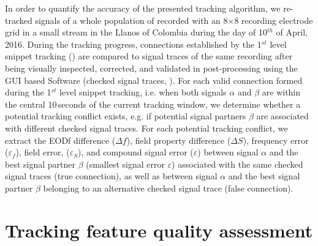 In order to quantify the accuracy of the presented tracking algorithm, we re-tracked signals of a whole population of \lepto{} recorded with an 8$\times$8 recording electrode grid in a small stream in the Llanos of Colombia during the day of 10$^{th}$ of April, 2016. During the tracking progress, connections established by the 1$^{st}$ level snippet tracking () are compared to signal traces of the same recording after being visually inspected, corrected, and validated in post-processing using the GUI based Software (checked signal traces, ). For each valid connection formed during the 1$^{st}$ level snippet tracking, i.e. when both signals $\alpha$ and $\beta$ are within the central 10\,seconds of the current tracking window, we determine whether a potential tracking conflict exists, e.g. if potential signal partners $\beta$ are associated with different checked signal traces. For each potential tracking conflict, we extract the EODf difference ($\Delta f$), field property difference ($\Delta S$), frequency error ($\varepsilon_f$), field error, ($\varepsilon_S$), and compound signal error ($\varepsilon$) between signal $\alpha$ and the best signal partner $\beta$ (smallest signal error $\varepsilon$) associated with the same checked signal traces (true connection), as well as between signal $\alpha$ and the best signal partner $\beta$ belonging to an alternative checked signal trace (false connection). 

\section{Tracking feature quality assessment}

